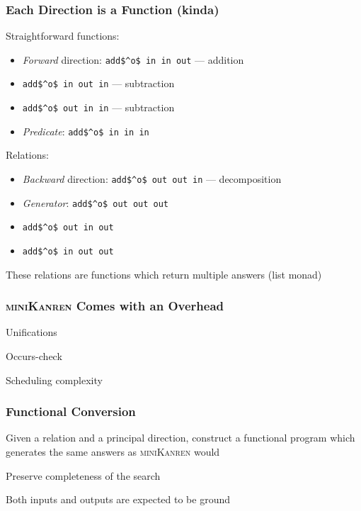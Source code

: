 \documentclass[xcolor=table]{beamer}
\newcommand{\mk}{\textsc{miniKanren}\xspace}
\begin{document}
\begin{frame}[fragile]
  \frametitle{Each Direction is a Function \pause (kinda)}
Straightforward functions:
\begin{itemize}
  \item \emph{Forward} direction: \lstinline{add$^o$ in in out} --- addition
  \item \lstinline{add$^o$ in out in} --- subtraction
  \item \lstinline{add$^o$ out in in} --- subtraction
  \item \emph{Predicate}: \lstinline{add$^o$ in in in}
\end{itemize}

\vfill

Relations:
\begin{itemize}
  \item \emph{Backward} direction: \lstinline{add$^o$ out out in} --- decomposition
  \item \emph{Generator}: \lstinline{add$^o$ out out out}
  \item \lstinline{add$^o$ out in out}
  \item \lstinline{add$^o$ in out out}
\end{itemize}
These relations are functions which return multiple answers (list monad)
\end{frame}

\begin{frame}[fragile]
  \frametitle{\mk Comes with an Overhead}
  \begin{center}
    Unifications
  \end{center}

  \begin{center}
    Occurs-check
  \end{center}

  \begin{center}
    Scheduling complexity
  \end{center}
\end{frame}

\begin{frame}[fragile]
  \frametitle{Functional Conversion}
\begin{center}
  Given a relation and a principal direction, construct a functional program which generates the same answers as \mk would
\end{center}

\vfill

\begin{center}
  Preserve completeness of the search
\end{center}

\vfill

\begin{center}
Both inputs and outputs are expected to be ground
\end{center}
\end{frame}
\end{document}

